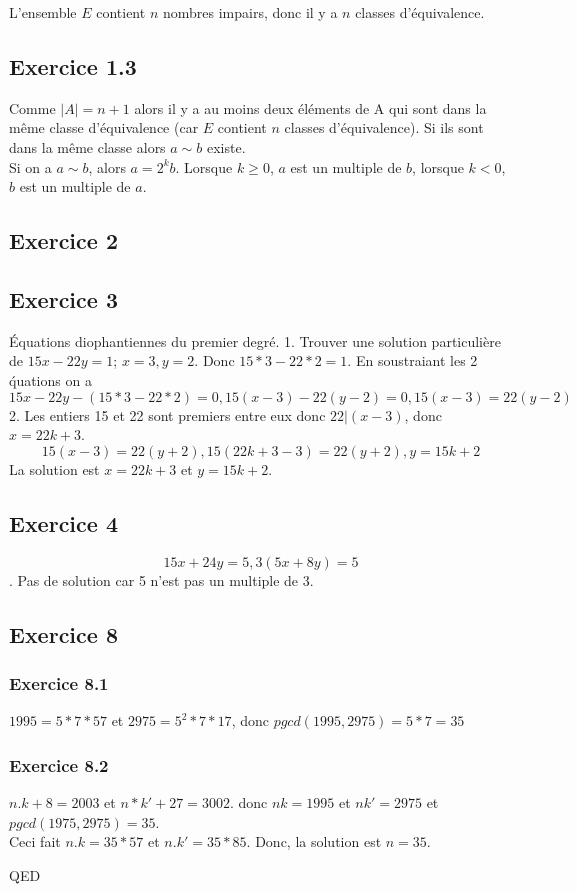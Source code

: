 \documentclass[]{book}
\theoremstyle{definition}
\begin{document}
L'ensemble $E$ contient $n$ nombres impairs, donc il y a $n$ classes d'\'equivalence.

\subsection*{Exercice 1.3}
Comme $|A| = n+1$ alors il y a au moins deux \'el\'ements de A qui sont dans la m\^eme classe d'\'equivalence (car $E$ contient $n$ classes d'\'equivalence). Si ils sont dans la m\^eme classe alors $a \sim b$ existe.\\

Si on a $a \sim b$, alors $a=2^kb$. Lorsque $k\geq 0$, $a$ est un multiple de $b$, lorsque $k<0$, $b$ est un multiple de $a$.

\subsection*{Exercice 2}

\subsection*{Exercice 3}
\'Equations diophantiennes du premier degr\'e.
1. Trouver une solution particuli\`ere de $15x - 22y = 1$; $x=3, y=2$. Donc $15*3-22*2 = 1$. En soustraiant les 2 \'quations on a 
$$15x - 22y - (15*3-22*2) = 0, 15(x-3) - 22(y-2) = 0, 15(x-3) = 22(y-2)$$
2. Les entiers 15 et 22 sont premiers entre eux donc $22|(x-3)$, donc $x= 22k+3$.
$$15(x-3) = 22(y+2), 15(22k+3-3) = 22(y+2), y = 15k+2$$
La solution est $x=22k+3$ et $y=15k+2$.

\subsection*{Exercice 4}
$$15x+24y = 5, 3(5x+8y) = 5$$.
Pas de solution car 5 n'est pas un multiple de 3.


\subsection*{Exercice 8}
\subsubsection*{Exercice 8.1}
$1995 = 5*7*57$ et $2975 = 5^2*7*17$, donc $pgcd(1995,2975) = 5*7 = 35$

\subsubsection*{Exercice 8.2}
$n.k+8 = 2003$ et $n*k' + 27 = 3002$. donc $nk=1995$ et $nk'=2975$ et $pgcd(1975,2975) = 35$.\\
Ceci fait $n.k=35*57$ et $n.k'=35*85$. Donc, la solution est $n=35$.  	
 


QED
\end{document}
